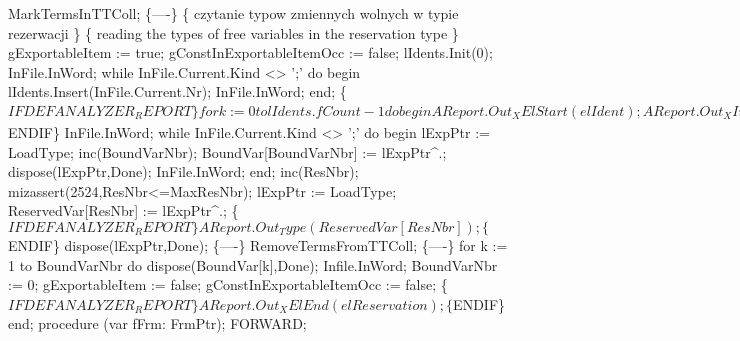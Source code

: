    MarkTermsInTTColl;
   \{----\}
   \{ czytanie typow zmiennych wolnych w typie rezerwacji \}
   \{ reading the types of free variables in the reservation type \}
   gExportableItem := true;
   gConstInExportableItemOcc := false;
   lIdents.Init(0);
   InFile.InWord;
   while InFile.Current.Kind <> ';' do
   begin
      lIdents.Insert(InFile.Current.Nr);
      InFile.InWord;
   end;
   \{$IFDEF ANALYZER_REPORT\}
   for k  :=  0 to lIdents.fCount - 1 do
   begin
      AReport.Out_XElStart(elIdent);
      AReport.Out_XIntAttr(atVid, lIdents.fList^[k]);
      AReport.Out_XElEnd0;
   end;
   \{$ENDIF\}
   InFile.InWord;
   while InFile.Current.Kind <> ';' do
   begin
      lExpPtr := LoadType;
      inc(BoundVarNbr);
      BoundVar[BoundVarNbr] := lExpPtr^.;
      dispose(lExpPtr,Done);
      InFile.InWord;
   end;
   inc(ResNbr);
   mizassert(2524,ResNbr<=MaxResNbr);
   lExpPtr := LoadType;
   ReservedVar[ResNbr] := lExpPtr^.;
   \{$IFDEF ANALYZER_REPORT\}
   AReport.Out_Type(ReservedVar[ResNbr]);
   \{$ENDIF\}
   dispose(lExpPtr,Done);
   \{----\}
   RemoveTermsFromTTColl;
   \{----\}
   for k := 1 to BoundVarNbr do dispose(BoundVar[k],Done);
   Infile.InWord;
   BoundVarNbr := 0;
   gExportableItem := false;
   gConstInExportableItemOcc := false;
   \{$IFDEF ANALYZER_REPORT\}
   AReport.Out_XElEnd(elReservation);
   \{$ENDIF\}
end;
\eatline
{}\nwendcode{}\nwdocspar
\nwenddocs{}\endmoddef\nwstartdeflinemarkup{}\nwenddeflinemarkup
procedure (var fFrm: FrmPtr); FORWARD;

